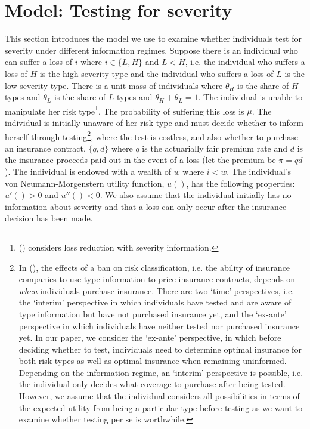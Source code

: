 \documentclass[nonatbib,preprint,12pt]{elsarticle}
\theoremstyle{plain}
\theoremstyle{definition}
\theoremstyle{plain}
\theoremstyle{TheoremNum}
\theoremstyle{CorollaryNum}
\theoremstyle{PropositionNum}
\theoremstyle{TheoremNum}
\begin{document}
\section{Model: Testing for severity}
This section introduces the model we use to examine whether individuals test for severity under different information regimes. Suppose there is an individual who can suffer a loss of $i$ where $i \in \{L,H\}$ and $L<H$, i.e. the individual who suffers a loss of $H$ is the high severity type and the individual who suffers a loss of $L$ is the low severity type. There is a unit mass of individuals where $\theta_H$ is the share of $H$-types and $\theta_L$ is the share of $L$ types and $\theta_H + \theta_L = 1$. The individual is unable to manipulate her risk type\footnote{\citeauthor{tan2025testing} (\citeyear{tan2025testing}) considers loss reduction with severity information.}. The probability of suffering this loss is $\mu$. The individual is initially unaware of her risk type and must decide whether to inform herself through testing\footnote{In \citeauthor{dionne2014economic} (\citeyear{dionne2014economic}), the effects of a ban on risk classification, i.e. the ability of insurance companies to use type information to price insurance contracts, depends on \textit{when} individuals purchase insurance. There are two `time' perspectives, i.e. the `interim' perspective in which individuals have tested and are aware of type information but have not purchased insurance yet, and the `ex-ante' perspective in which individuals have neither tested nor purchased insurance yet. In our paper, we consider the `ex-ante' perspective, in which before deciding whether to test, individuals need to determine optimal insurance for both risk types as well as optimal insurance when remaining uninformed. Depending on the information regime, an `interim' perspective is possible, i.e. the individual only decides what coverage to purchase after being tested. However, we assume that the individual considers all possibilities in terms of the expected utility from being a particular type before testing as we want to examine whether testing per se is worthwhile.}, where the test is costless, and also whether to purchase an insurance contract, $\{q,d\}$ where $q$ is the actuarially fair premium rate and $d$ is the insurance proceeds paid out in the event of a loss (let the premium be $\pi = qd$). The individual is endowed with a wealth of $w$ where $i < w$. The individual's von Neumann-Morgenstern utility function, $u()$, has the following properties: $u'() > 0$ and $u''()<0$. We also assume that the individual initially has no information about severity and that a loss can only occur after the insurance decision has been made.
\end{document}
